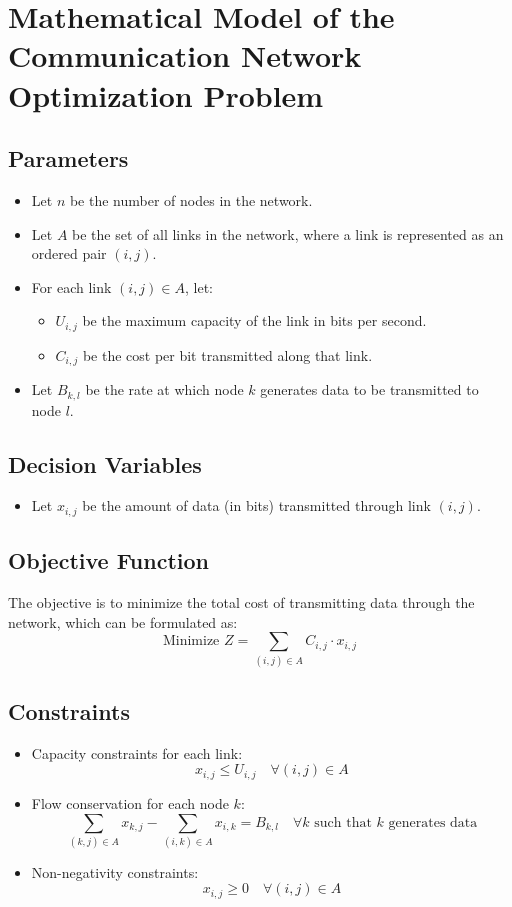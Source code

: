 \documentclass{article}
\begin{document}
\section*{Mathematical Model of the Communication Network Optimization Problem}

\subsection*{Parameters}
\begin{itemize}
    \item Let \( n \) be the number of nodes in the network.
    \item Let \( A \) be the set of all links in the network, where a link is represented as an ordered pair \( (i, j) \).
    \item For each link \( (i, j) \in A \), let:
        \begin{itemize}
            \item \( U_{i,j} \) be the maximum capacity of the link in bits per second.
            \item \( C_{i,j} \) be the cost per bit transmitted along that link.
        \end{itemize}
    \item Let \( B_{k,l} \) be the rate at which node \( k \) generates data to be transmitted to node \( l \).
\end{itemize}

\subsection*{Decision Variables}
\begin{itemize}
    \item Let \( x_{i,j} \) be the amount of data (in bits) transmitted through link \( (i, j) \).
\end{itemize}

\subsection*{Objective Function}
The objective is to minimize the total cost of transmitting data through the network, which can be formulated as:
\[
\text{Minimize } Z = \sum_{(i,j) \in A} C_{i,j} \cdot x_{i,j}
\]

\subsection*{Constraints}
\begin{itemize}
    \item Capacity constraints for each link:
    \[
    x_{i,j} \leq U_{i,j} \quad \forall (i, j) \in A
    \]
    
    \item Flow conservation for each node \( k \):
    \[
    \sum_{(k,j) \in A} x_{k,j} - \sum_{(i,k) \in A} x_{i,k} = B_{k,l} \quad \forall k \text{ such that } k \text{ generates data}
    \]
    
    \item Non-negativity constraints:
    \[
    x_{i,j} \geq 0 \quad \forall (i, j) \in A
    \]
\end{itemize}
\end{document}
